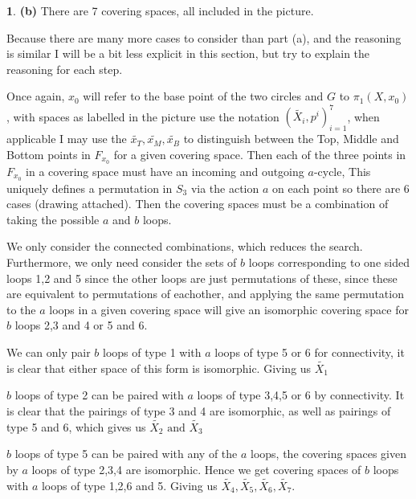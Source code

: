 \documentclass[10.5pt]{article}
\theoremstyle{definition}
\newtheorem{pb}{}
\newcommand{\tand}{\text{ and }}
\begin{document}
\begin{pb}
        \textbf{(b)} There are 7 covering spaces, all included in the picture.
        
        Because there are many more cases to consider than part (a), and the reasoning is similar I will be a bit less explicit in this section, but try to explain the reasoning for each step.

        Once again, \(x_0\) will refer to the base point of the two circles and \(G\) to \(\pi_1(X,x_0)\), with spaces as labelled in the picture use the notation \((\tilde{X_i},p^i)_{i=1}^7\), when applicable I may use the \(\tilde{x_T},\tilde{x_M},\tilde{x_B}\) to distinguish between the Top, Middle and Bottom points in \(F_{x_0}\) for a given covering space. Then each of the three points in \(F_{x_0}\) in a covering space must have an incoming and outgoing \(a\)-cycle, This uniquely defines a permutation in \(S_3\) via the action \(a\) on each point so there are 6 cases (drawing attached). Then the covering spaces must be a combination of taking the possible \(a\) and \(b\) loops.

        We only consider the connected combinations, which reduces the search. Furthermore, we only need consider the sets of \(b\) loops corresponding to one sided loops 1,2 and 5 since the other loops are just permutations of these, since these are equivalent to permutations of eachother, and applying the same permutation to the \(a\) loops in a given covering space will give an isomorphic covering space for \(b\) loops 2,3 and 4 or 5 and 6.
        
        We can only pair \(b\) loops of type 1 with \(a\) loops of type 5 or 6 for connectivity, it is clear that either space of this form is isomorphic. Giving us \(\tilde{X_1}\)

        \(b\) loops of type 2 can be paired with \(a\) loops of type 3,4,5 or 6 by connectivity. It is clear that the pairings of type 3 and 4 are isomorphic, as well as pairings of type 5 and 6, which gives us \(\tilde{X_2} \tand \tilde{X_3}\)

        \(b\) loops of type 5 can be paired with any of the \(a\) loops, the covering spaces given by \(a\) loops of type 2,3,4 are isomorphic. Hence we get covering spaces of \(b\) loops with \(a\) loops of type 1,2,6 and 5. Giving us \(\tilde{X_4},\tilde{X_5},\tilde{X_6},\tilde{X_7}\).


\end{pb}
\end{document}

